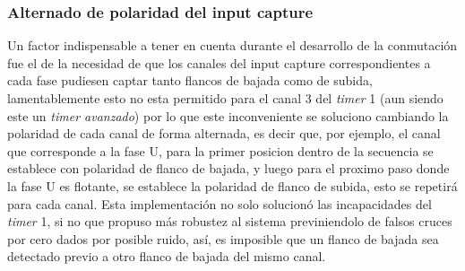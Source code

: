 \subsubsection{Alternado de polaridad del input capture}
Un factor indispensable a tener en cuenta durante el desarrollo de la conmutación fue el de la necesidad de que los canales del input capture correspondientes a cada fase pudiesen captar tanto flancos de bajada como de subida, lamentablemente esto no esta permitido para el canal 3 del \textit{timer} 1 (aun siendo este un \textit{timer avanzado}) por lo que este inconveniente se soluciono cambiando la polaridad de cada canal de forma alternada, es decir que, por ejemplo, el canal que corresponde a la fase U, para la primer posicion dentro de la secuencia se establece con polaridad de flanco de bajada, y luego para el proximo paso donde la fase U es flotante, se establece la polaridad de flanco de subida, esto se repetirá para cada canal. Esta implementación no solo solucionó las incapacidades del \textit{timer} 1, si no que propuso más robustez al sistema previniendolo de falsos cruces por cero dados por posible ruido, así, es imposible que un flanco de bajada sea detectado previo a otro flanco de bajada del mismo canal.
\setlength{\tabcolsep}{3pt} %
\begin{table}[htbp]
  \centering
  \caption{Secuencia de conmutación de 6 pasos para motor BLDC}
  \label{tab:bldc_commutation}
\end{table}
